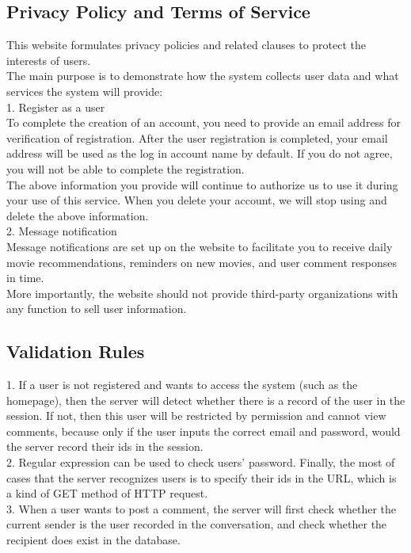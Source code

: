 \documentclass[12pt]{article}
\begin{document}
\subsection{Privacy Policy and Terms of Service}
This website formulates privacy policies and related clauses to protect the interests of users.\\
The main purpose is to demonstrate how the system collects user data and what services the system will provide:\\
1. Register as a user\\
To complete the creation of an account, you need to provide an email address for verification of registration. After the user registration is completed, your email address will be used as the log in account name by default. If you do not agree, you will not be able to complete the registration.\\
The above information you provide will continue to authorize us to use it during your use of this service. When you delete your account, we will stop using and delete the above information.\\
2. Message notification\\
Message notifications are set up on the website to facilitate you to receive daily movie recommendations, reminders on new movies, and user comment responses in time.\\
More importantly, the website should not provide third-party organizations with any function to sell user information.\\

\subsection{Validation Rules}
1. If a user is not registered and wants to access the system (such as the homepage), then the server will detect whether there is a record of the user in the session. If not, then this user will be restricted by permission and cannot view comments, because only if the user inputs the correct email and password, would the server record their ids in the session. \\
2. Regular expression can be used to check users’ password. Finally, the most of cases that the server recognizes users is to specify their ids in the URL, which is a kind of GET method of HTTP request. \\
3. When a user wants to post a comment, the server will first check whether the current sender is the user recorded in the conversation, and check whether the recipient does exist in the database. \\ 
\end{document}
